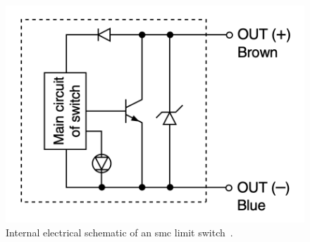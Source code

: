         \begin{figure}[H]
            \centering
            \includegraphics[scale = 0.4]{2_images/autSwShm.png}
            \caption{Internal electrical schematic of an \acrshort{smc} limit switch~\cite{smcRot}.}
            \label{fig:autSwShm}
        \end{figure}

